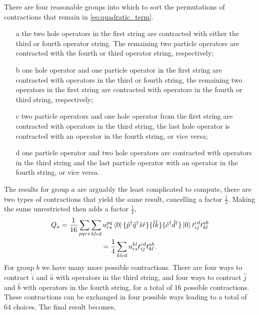 There are four reasonable groups into which to sort the
permutations of contractions that remain in \autoref{eq:quadratic_term}.
\begin{itemize}
    \item[a] the two hole operators in the first string are
    contracted with either the third or fourth operator string. The remaining 
    two particle operators are contracted with the fourth or third operator 
    string, respectively;
    \item[b] one hole operator and one particle operator in the first string
    are contracted with operators in the third or fourth string, the remaining two
    operators in the first string are contracted with operators 
    in the fourth or third string, respectively;
   \item[c] two particle operators and one hole operator from the 
    first string are contracted with operators in the third string,
    the last hole operator is contracted with an operator in the 
    fourth string, or vice versa;
   \item[d] one particle operator and two hole operators are contracted 
    with operators in the third string and the last particle operator 
    with an operator in the fourth string, or vice versa.
\end{itemize}
The results for group $a$ are arguably the least complicated to 
compute, there are two types of contractions that yield the same result, 
cancelling a factor $\frac{1}{2}$. Making the sums unrestricted then 
adds a factor $\frac{1}{4}$,
\begin{equation}
    \begin{gathered}
        Q_a = \frac{1}{16}\sum_{pqrs}\sum_{klcd} 
        u^{pq}_{rs} \bra{0}
            \{\hat{p}^\dagger \hat{q}^\dagger \hat{s} \hat{r} \}
            \{\hat{l} \hat{k} \}
            \{\hat{c}^\dagger \hat{d}^\dagger \}
        \ket{0} t^{cd}_{ij} t^{ab}_{kl} \\
        = \frac{1}{4} \sum_{klcd}
        u^{kl}_{rs} t^{cd}_{ij} t^{ab}_{kl}.
    \end{gathered}
\end{equation}
For group $b$ we have many more possible contractions.
There are four ways to contract $\hat{i}$ and $\hat{a}$
with operators in the third string, and four ways to contract $\hat{j}$ and 
$\hat{b}$ with operators in the fourth string, for a total of $16$ possible 
contractions. These contractions can be exchanged in four possible ways
leading to a total of $64$ choices. The final result becomes,
